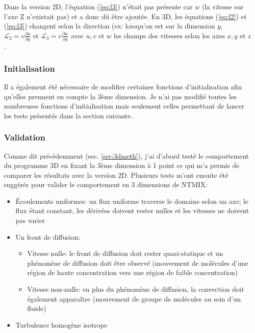 Dans la version 2D, l'équation (\ref{eq:l3}) n'était pas présente car $w$ (la vitesse sur l'axe Z n'existait pas) et a donc dû être ajoutée. En 3D, les équations (\ref{eq:l2}) et (\ref{eq:l3}) changent selon la direction (ex: lorsqu'on est sur la dimension $y$, $\mathcal{L}_2 = v \frac{\partial u}{\partial y}$ et $\mathcal{L}_3 = v \frac{\partial w}{\partial y}$ avec $u,v$ et $w$ les champs des vitesses selon les axes $x,y$ et $z$.

\subsubsection{Initialisation}Il a également été nécessaire de modifier certaines fonctions d'initialisation afin qu'elles prennent en compte la 3ème dimension. Je n'ai pas modifié toutes les nombreuses fonctions d'initialisation mais seulement celles permettant de lancer les tests présentés dans la section suivante.





\subsubsection{Validation}\label{sec:3D-validation}
Comme dit précédemment (sec. \ref{sec:3dmeth}), j'ai d'abord testé le comportement du programme 3D en fixant la 3ème dimension à 1 point ce qui m'a permis de comparer les résultats avec la version 2D. Plusieurs tests m'ont ensuite été suggérés pour valider le comportement en 3 dimensions de NTMIX:

\begin{itemize}
\item Écoulements uniformes: un flux uniforme traverse le domaine selon un axe; le flux étant constant, les dérivées doivent rester nulles et les vitesses ne doivent pas varier
\item Un front de diffusion:
  \begin{itemize}
  \item Vitesse nulle: le front de diffusion doit rester quasi-statique et un phénomène de diffusion doit être observé (mouvement de molécules d'une région de haute concentration vers une région de faible concentration)
  \item Vitesse non-nulle: en plus du phénomène de diffusion, la convection doit également apparaître (mouvement de groupe de molécules au sein d'un fluide)
  \end{itemize}
\item Turbulence homogène isotrope
\end{itemize}

